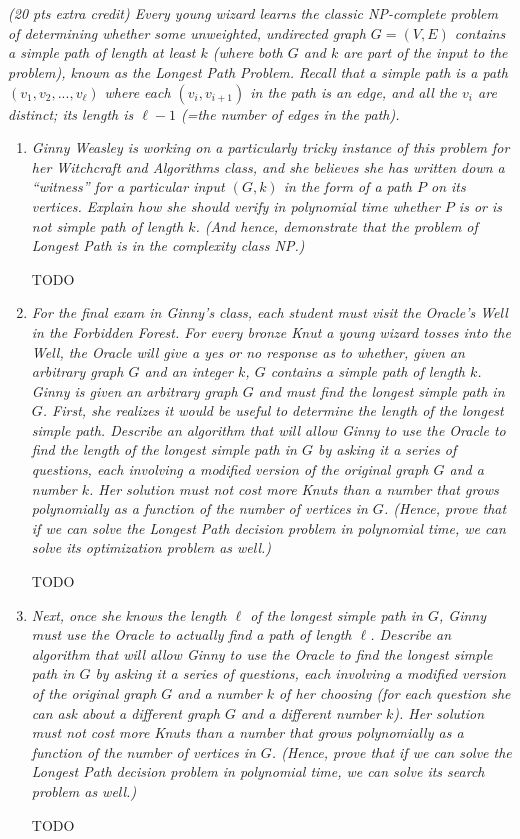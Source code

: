 \documentclass[12pt]{article} \setlength{\oddsidemargin}{0in}
\begin{document}
\section{}
\textit{(20 pts extra credit) Every young wizard learns the classic NP-complete problem of determining whether some unweighted, undirected graph $G = (V,E)$ contains a simple path of length at least $k$ (where both $G$ and $k$ are part of the input to the problem), known as the Longest Path Problem. Recall that a simple path is a path $(v_1, v_2, ... , v_\ell)$ where each $(v_i, v_{i+1})$ in the path is an edge, and all the $v_i$ are distinct; its length is $\ell-1$ (=the number of edges in the path).}
\begin{enumerate}
\item\textit{Ginny Weasley is working on a particularly tricky instance of this problem for her Witchcraft and Algorithms class, and she believes she has written down a ``witness'' for a particular input $(G, k)$ in the form of a path $P$ on its vertices. Explain how she should verify in polynomial time whether $P$ is or is not simple path of length  $k$. (And hence, demonstrate that the problem of Longest Path is in the complexity class NP.)}

TODO

\item\textit{For the final exam in Ginny's class, each student must visit the Oracle's Well in the Forbidden Forest. For every bronze Knut a young wizard tosses into the Well, the Oracle will give a yes or no response as to whether, given an arbitrary graph $G$ and an integer $k$, $G$ contains a simple path of length  $k$. Ginny is given an arbitrary graph $G$ and must find the longest simple path in $G$. First, she realizes it would be useful to determine the length of the longest simple path. Describe an algorithm that will allow Ginny to use the Oracle to find the length of the longest simple path in $G$ by asking it a series of questions, each involving a modified version of the original graph $G$ and a number $k$. Her solution must not cost more Knuts than a number that grows polynomially as a function of the number of vertices in $G$. (Hence, prove that if we can solve the Longest Path decision problem in polynomial time, we can solve its optimization problem as well.)}

TODO

\item\textit{Next, once she knows the length $\ell$ of the longest simple path in $G$, Ginny must use the Oracle to actually find a path of length $\ell$. Describe an algorithm that will allow Ginny to use the Oracle to find the longest simple path in $G$ by asking it a series of questions, each involving a modified version of the original graph $G$ and a number $k$ of her choosing (for each question she can ask about a different graph $G$ and a different number $k$). Her solution must not cost more Knuts than a number that grows polynomially as a function of the number of vertices in $G$. (Hence, prove that if we can solve the Longest Path decision problem in polynomial time, we can solve its search problem as well.)}

TODO

\end{enumerate}
\end{document}
